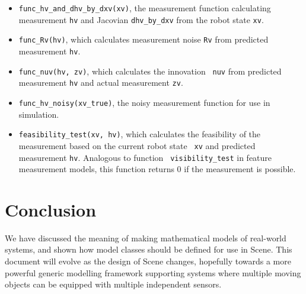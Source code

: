 \documentclass{article}
\begin{document}
  \begin{itemize}
\item {\tt func\_hv\_and\_dhv\_by\_dxv(xv)}, the measurement function
  calculating measurement {\tt hv} and Jacovian {\tt dhv\_by\_dxv} from
  the robot state {\tt xv}.
\item {\tt func\_Rv(hv)}, which calculates measurement noise {\tt Rv}
  from predicted measurement {\tt hv}.
\item {\tt func\_nuv(hv, zv)}, which calculates the innovation {\tt
    nuv} from predicted measurement {\tt hv} and actual measurement {\tt zv}.
\item {\tt func\_hv\_noisy(xv\_true)}, the noisy measurement function
  for use in simulation.
\item {\tt feasibility\_test(xv, hv)}, which calculates the 
  feasibility of the measurement based on the current robot state {\tt
    xv} and predicted measurement {\tt hv}. Analogous to function {\tt
    visibility\_test} in feature measurement models, this function returns
  0 if the measurement is possible.
\end{itemize}

\section{Conclusion}

We have discussed the meaning of making mathematical models of
real-world systems, and shown how model classes should be defined for
use in Scene. This document will evolve as the design of Scene
changes, hopefully towards a more powerful generic modelling framework
supporting systems where multiple moving objects can be equipped with
multiple independent sensors.

  
\end{document}

